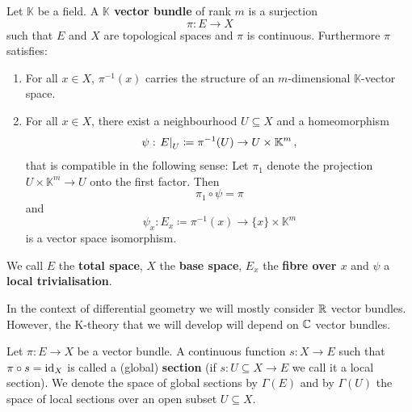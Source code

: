 \begin{definition}\label{def:vb-vectorBundles} Let $\mathbb{K}$ be a field.
	A \textbf{$\mathbb{K}$ vector bundle} of rank $m$ is a surjection 
	\begin{equation*}
		\pi: E\to X
	\end{equation*}such that $E$ and $X$ are topological spaces and $\pi$ is continuous. Furthermore $\pi$ satisfies:
	 \begin{enumerate}
	 	\item For all $x\in X$, $\pi^{-1}(x)$ carries the structure of an $m$-dimensional $\mathbb{K}$-vector space.
	 	\item For all $x\in X$, there exist a neighbourhood $U\subseteq X$ and a homeomorphism 
		 	\begin{equation*}
		 		\psi: \left.E\right|_{U}\coloneq \pi^{-1}(U) \to U\times \mathbb{K}^m \,,
		 	\end{equation*}
		 	that is compatible in the following sense: Let $\pi_1$ denote the projection $ U\times \mathbb{K}^m \to U$ onto the first factor. Then 
		 	\begin{equation*}
		 		\pi_1 \circ \psi=\pi  
		 	\end{equation*} and 
		 	\begin{equation*}
		 		\psi_x: E_x\coloneq \pi^{-1}(x)\to \{x\}\times \mathbb{K}^m 
		 	\end{equation*} is a vector space isomorphism. 
	 \end{enumerate}
	 We call $E$ the \textbf{total space}, $X$ the \textbf{base space}, $E_x$ the \textbf{fibre over $x$} and $\psi$ a \textbf{local trivialisation}.
\end{definition}
\begin{remark}
	In the context of differential geometry we will mostly consider $\mathbb{R}$ vector bundles. However, the K-theory that we will develop will depend on $\mathbb{C}$ vector bundles.
\end{remark}
\begin{definition}
	Let $\pi: E \to X$ be a vector bundle. A continuous function $s: X\to E$ such that $\pi\circ s=\operatorname{\mathrm{id}}_X$ is called a (global) \textbf{section} (if $s:U\subseteq X \to E$ we call it a local section). We denote the space of global sections by $\Gamma(E)$ and by $\Gamma(U)$ the space of local sections over an open subset $U\subseteq X$. 
\end{definition}

